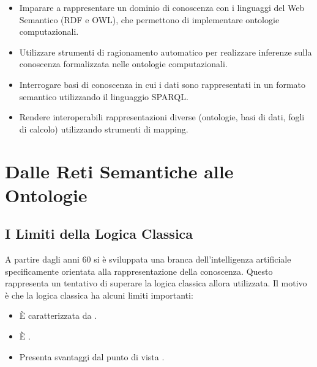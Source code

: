 \begin{itemize}
  \item Imparare a rappresentare un dominio di conoscenza con i linguaggi
del Web Semantico (RDF e OWL), che permettono di implementare
ontologie computazionali. 
\item Utilizzare strumenti di ragionamento automatico per realizzare
inferenze sulla conoscenza formalizzata nelle ontologie
computazionali. 
\item Interrogare basi di conoscenza in cui i dati sono rappresentati in un
formato semantico utilizzando il linguaggio SPARQL. 
\item Rendere interoperabili rappresentazioni diverse (ontologie, basi di
dati, fogli di calcolo) utilizzando strumenti di mapping.
\end{itemize}

\section{Dalle Reti Semantiche alle Ontologie}

\subsection{I Limiti della Logica Classica}

A partire dagli anni 60 si è sviluppata una branca
dell’intelligenza artificiale specificamente orientata alla
rappresentazione della conoscenza. Questo rappresenta un tentativo di superare la logica classica allora utilizzata. Il motivo è che la logica classica ha alcuni limiti importanti: 

\begin{itemize}
  \item È caratterizzata da .
  \item È . 
  \item Presenta svantaggi dal punto di vista .
\end{itemize}



